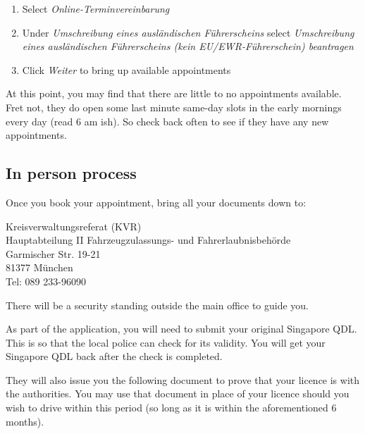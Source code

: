 \documentclass{article}
\newcommand{\de}[1]{\textcolor{NavyBlue}{\textit{#1}}}
\begin{document}
        \begin{enumerate}
            \item Select \de{Online-Terminvereinbarung}
            \item Under \de{Umschreibung eines ausländischen Führerscheins} select \de{Umschreibung eines ausländischen Führerscheins (kein EU/EWR-Führerschein) beantragen}
            \item Click \de{Weiter} to bring up available appointments
        \end{enumerate}
        
        At this point, you may find that there are little to no appointments available. Fret not, they do open some last minute same-day slots in the early mornings every day (read 6 am ish). So check back often to see if they have any new appointments. 
        
    \subsection{In person process}
    	\label{subsec:inperson}
        Once you book your appointment, bring all your documents down to:
        
        \begin{center}
            Kreisverwaltungsreferat (KVR) \\
            Hauptabteilung II Fahrzeugzulassungs- und Fahrerlaubnisbehörde \\
            Garmischer Str. 19-21 \\
            81377 München \\
            
            Tel: 089 233-96090
        \end{center}
        
        There will be a security standing outside the main office to guide you. 
        
        As part of the application, you will need to submit your original Singapore QDL. This is so that the local police can check for its validity. You will get your Singapore QDL back after the check is completed.
        
        They will also issue you the following document to prove that your licence is with the authorities. You may use that document in place of your licence should you wish to drive within this period (so long as it is within the aforementioned 6 months).
        
\end{document}
